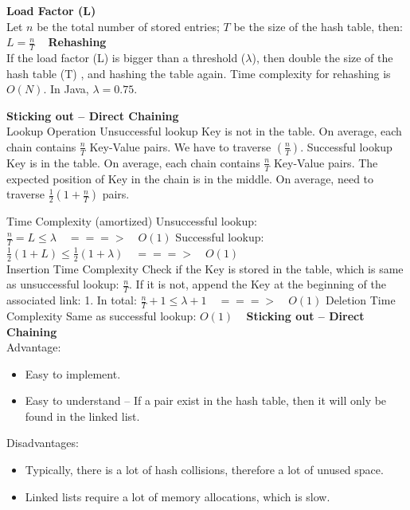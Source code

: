 \textbf{Load Factor (L)} \\
Let $n$ be the total number of stored entries;
$T$ be the size of the hash table, then: $L=\frac{n}{T}$
 
\textbf{Rehashing} \\
If the load factor (L) is bigger than a threshold ($\lambda$), then double the size of the hash table (T) , and hashing the table again.
Time complexity for rehashing is $O(N)$.
In Java, $\lambda = 0.75$.

\textbf{Sticking out – Direct Chaining} \\
Lookup Operation
Unsuccessful lookup
Key is not in the table.
On average, each chain contains $\frac{n}{T}$ Key-Value pairs.
We have to traverse $(\frac{n}{T})$.
Successful lookup
Key is in the table.
On average, each chain contains $\frac{n}{T}$ Key-Value pairs.
The expected position of Key in the chain is in the middle.
On average, need to traverse $\frac{1}{2}(1+\frac{n}{T})$ pairs.

Time Complexity (amortized)
Unsuccessful lookup:
$\frac{n}{T}=L \le \lambda \quad ===> \quad O(1)$
Successful lookup:
$\frac{1}{2}(1+L) \le \frac{1}{2}(1+\lambda) \quad ===> \quad O(1)$ \\

Insertion Time Complexity
Check if the Key is stored in the table, which is same as unsuccessful lookup: $\frac{n}{T}$.
If it is not, append the Key at the beginning of the associated link: 1.
In total: $\frac{n}{T}+1 \le \lambda+1 \quad ===> \quad O(1)$
Deletion Time Complexity
Same as successful lookup: $O(1)$
 
\textbf{Sticking out – Direct Chaining} \\
Advantage:
\begin{itemize}
    \item Easy to implement.
    \item Easy to understand – If a pair exist in the hash table, then it will only be found in the linked list.
\end{itemize}
Disadvantages:
\begin{itemize}
    \item Typically, there is a lot of hash collisions, therefore a lot of unused space.
    \item Linked lists require a lot of memory allocations, which is slow.
\end{itemize}

